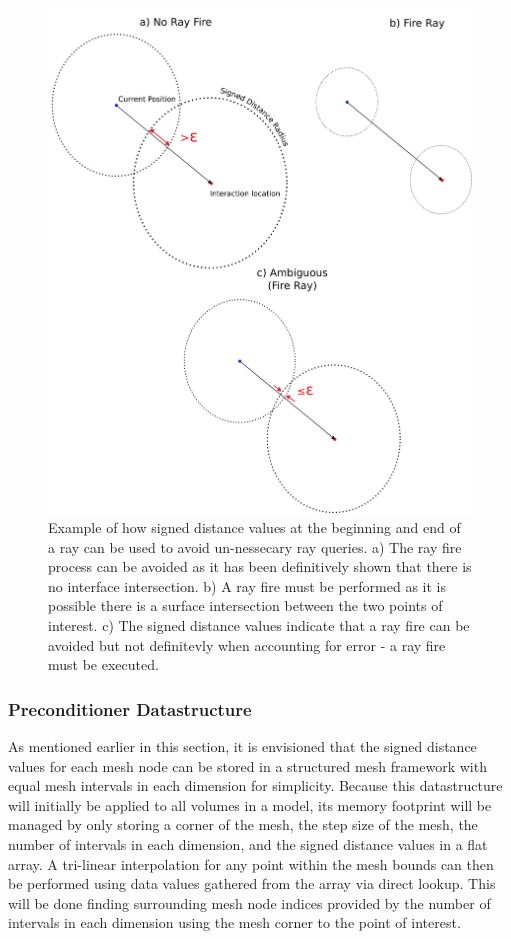 \documentclass[12pt, a4paper]{article}
\begin{document}
\begin{figure}[H]
  \centering
  \includegraphics[trim = 50 0 0 0 , scale=0.6]{preconditioner_ex.png}
  \caption{Example of how signed distance values at the beginning and end of a ray can be used to avoid un-nessecary ray queries. a) The ray fire process can be avoided as it has been definitively shown that there is no interface intersection. b) A ray fire must be performed as it is possible there is a surface intersection between the two points of interest. c) The signed distance values indicate that a ray fire can be avoided but not definitevly when accounting for error - a ray fire must be executed.}
  \label{preconditioner_ex}
\end{figure}

\newpage


 \subsubsection{Preconditioner Datastructure}

 As mentioned earlier in this section, it is envisioned that the signed distance values for each mesh node can be stored in a structured mesh framework with equal mesh intervals in each dimension for simplicity. Because this datastructure will initially be applied to all volumes in a model, its memory footprint will be managed by only storing a corner of the mesh, the step size of the mesh, the number of intervals in each dimension, and the signed distance values in a flat array. A tri-linear interpolation for any point within the mesh bounds can then be performed using data values gathered from the array via direct lookup. This will be done finding surrounding mesh node indices provided by the number of intervals in each dimension using the mesh corner to the point of interest.
 
\end{document}
